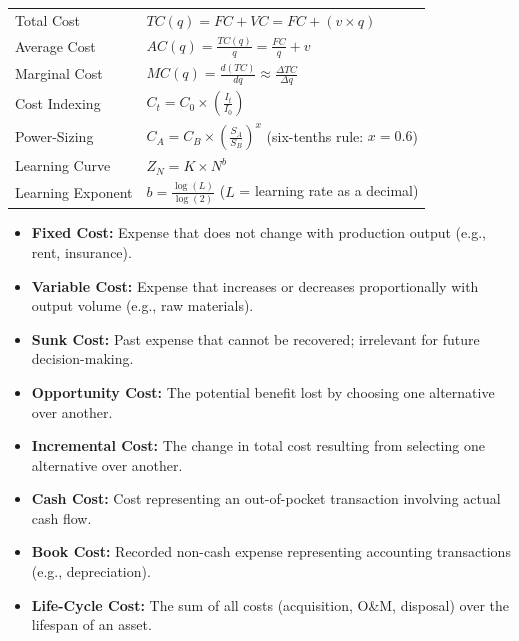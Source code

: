 \documentclass[12pt,a4paper]{article}
\renewcommand{\arraystretch}{1.45}
\begin{document}
\begin{tcolorbox}[formulabox, title={\textbf{Key Formulas at a Glance}}]
\renewcommand{\arraystretch}{1.3}
\begin{tabularx}{\linewidth}{B{3.8cm} X}
Total Cost              & $TC(q) = FC + VC = FC + (v \times q)$ \\[4pt]
Average Cost            & $AC(q) = \frac{TC(q)}{q} = \frac{FC}{q} + v$ \\[4pt]
Marginal Cost           & $MC(q) = \frac{d(TC)}{dq} \approx \frac{\Delta TC}{\Delta q}$ \\[4pt]
Cost Indexing           & $C_t = C_0 \times \left( \frac{I_t}{I_0} \right)$ \\[6pt]
Power-Sizing            & $C_A = C_B \times \left( \frac{S_A}{S_B} \right)^x$ \quad (six-tenths rule: $x = 0.6$) \\[6pt]
Learning Curve          & $Z_N = K \times N^b$ \\[4pt]
Learning Exponent       & $b = \frac{\log(L)}{\log(2)}$ \quad ($L$ = learning rate as a decimal)
\end{tabularx}
\end{tcolorbox}

\begin{tcolorbox}[defbox, title={\textbf{One-Line Definitions}}]
\begin{itemize}[leftmargin=*, itemsep=2pt, topsep=0pt]
  \item \textbf{Fixed Cost:} Expense that does not change with production output (e.g., rent, insurance).
  \item \textbf{Variable Cost:} Expense that increases or decreases proportionally with output volume (e.g., raw materials).
  \item \textbf{Sunk Cost:} Past expense that cannot be recovered; irrelevant for future decision-making.
  \item \textbf{Opportunity Cost:} The potential benefit lost by choosing one alternative over another.
  \item \textbf{Incremental Cost:} The change in total cost resulting from selecting one alternative over another.
  \item \textbf{Cash Cost:} Cost representing an out-of-pocket transaction involving actual cash flow.
  \item \textbf{Book Cost:} Recorded non-cash expense representing accounting transactions (e.g., depreciation).
  \item \textbf{Life-Cycle Cost:} The sum of all costs (acquisition, O\&M, disposal) over the lifespan of an asset.
\end{itemize}
\end{tcolorbox}
\end{document}
